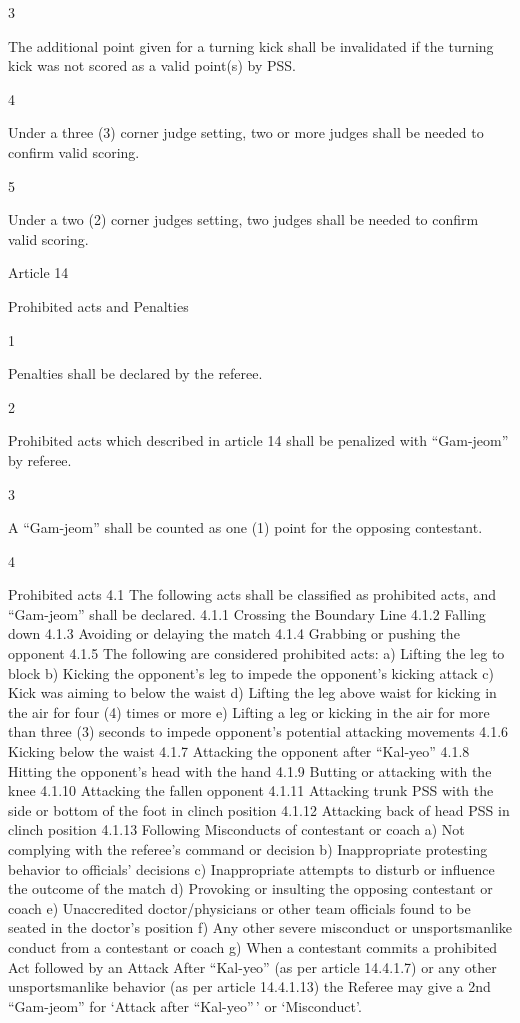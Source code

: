 \documentclass[
]{report}
\begin{document}
3

The additional point given for a turning kick shall be invalidated if
the turning kick was not scored as a valid point(s) by PSS.

4

Under a three (3) corner judge setting, two or more judges shall be
needed to confirm valid scoring.

5

Under a two (2) corner judges setting, two judges shall be needed to
confirm valid scoring.

Article 14

Prohibited acts and Penalties

1

Penalties shall be declared by the referee.

2

Prohibited acts which described in article 14 shall be penalized with
``Gam-jeom'' by referee.

3

A ``Gam-jeom'' shall be counted as one (1) point for the opposing
contestant.

4

Prohibited acts 4.1 The following acts shall be classified as prohibited
acts, and ``Gam-jeom'' shall be declared. 4.1.1 Crossing the Boundary
Line 4.1.2 Falling down 4.1.3 Avoiding or delaying the match 4.1.4
Grabbing or pushing the opponent 4.1.5 The following are considered
prohibited acts: a) Lifting the leg to block b) Kicking the opponent's
leg to impede the opponent's kicking attack c) Kick was aiming to below
the waist d) Lifting the leg above waist for kicking in the air for four
(4) times or more e) Lifting a leg or kicking in the air for more than
three (3) seconds to impede opponent's potential attacking movements
4.1.6 Kicking below the waist 4.1.7 Attacking the opponent after
``Kal-yeo'' 4.1.8 Hitting the opponent's head with the hand 4.1.9
Butting or attacking with the knee 4.1.10 Attacking the fallen opponent
4.1.11 Attacking trunk PSS with the side or bottom of the foot in clinch
position 4.1.12 Attacking back of head PSS in clinch position 4.1.13
Following Misconducts of contestant or coach a) Not complying with the
referee's command or decision b) Inappropriate protesting behavior to
officials' decisions c) Inappropriate attempts to disturb or influence
the outcome of the match d) Provoking or insulting the opposing
contestant or coach e) Unaccredited doctor/physicians or other team
officials found to be seated in the doctor's position f) Any other
severe misconduct or unsportsmanlike conduct from a contestant or coach
g) When a contestant commits a prohibited Act followed by an Attack
After ``Kal-yeo'' (as per article 14.4.1.7) or any other unsportsmanlike
behavior (as per article 14.4.1.13) the Referee may give a 2nd
``Gam-jeom'' for `Attack after ``Kal-yeo''\,' or `Misconduct'.
\end{document}

